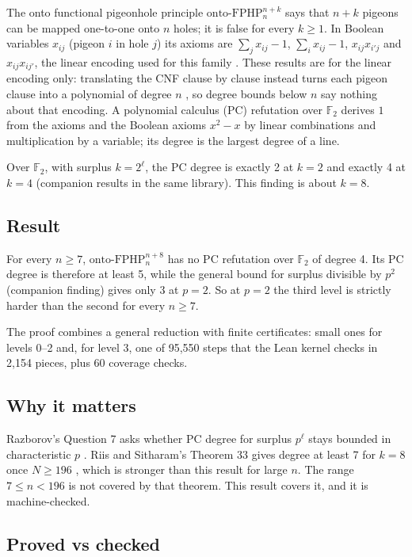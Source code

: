 \documentclass{article}
\begin{document}
The onto functional pigeonhole principle $\mathrm{onto\text{-}FPHP}^{n+k}_n$ says that $n+k$
pigeons can be mapped one-to-one onto $n$ holes; it is false for every $k\ge1$. In Boolean
variables $x_{ij}$ (pigeon $i$ in hole $j$) its axioms are $\sum_j x_{ij}-1$,
$\sum_i x_{ij}-1$, $x_{ij}x_{i'j}$ and $x_{ij}x_{ij'}$, the linear encoding used for this family
\cite{beame1998counting,razborov2001php}. These results are for the linear encoding only: translating the CNF clause by clause instead turns each pigeon clause into a polynomial of degree $n$ \cite{razborov2001php}, so degree bounds below $n$ say nothing about that encoding. A polynomial calculus (PC) refutation over
$\mathbb F_2$ derives $1$ from the axioms and the Boolean axioms $x^2-x$ by linear combinations
and multiplication by a variable; its degree is the largest degree of a line.

Over $\mathbb F_2$, with surplus $k=2^\ell$, the PC degree is exactly 2 at $k=2$ and exactly 4 at
$k=4$ (companion results in the same library). This finding is about $k=8$.

\subsection*{Result}

For every $n\ge7$, $\mathrm{onto\text{-}FPHP}^{n+8}_n$ has no PC refutation over $\mathbb F_2$ of
degree 4. Its PC degree is therefore at least 5, while the general bound for surplus divisible
by $p^2$ (companion finding) gives only 3 at $p=2$. So at $p=2$ the third level is strictly
harder than the second for every $n\ge7$.

The proof combines a general reduction with finite certificates: small ones for levels 0--2 and,
for level 3, one of 95,550 steps that the Lean kernel checks in 2,154 pieces, plus 60 coverage checks.

\subsection*{Why it matters}

Razborov's Question 7 asks whether PC degree for surplus $p^\ell$ stays bounded in characteristic
$p$ \cite{razborov2001php}. Riis and Sitharam's Theorem 33 gives degree at least 7 for $k=8$ once
$N\ge196$ \cite{riis1997nonconstant}, which is stronger than this result for large $n$. The range
$7\le n<196$ is not covered by that theorem. This result covers it, and it is machine-checked.

\subsection*{Proved vs checked}
\end{document}
